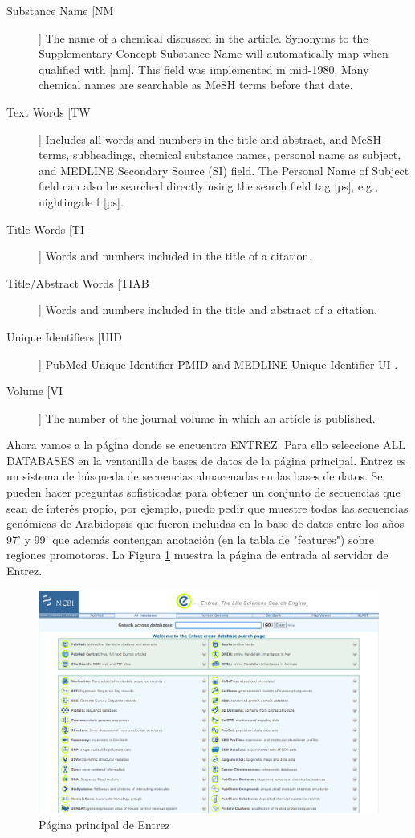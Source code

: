 \documentclass[letter,11pt]{book}
\begin{document}
\begin{description}
\item[Substance Name [NM]] The name of a chemical discussed in the article. Synonyms to the Supplementary Concept Substance Name will automatically map when qualified with [nm]. This field was implemented in mid-1980. Many chemical names are searchable as MeSH terms before that date. 
\item[Text Words [TW]] Includes all words and numbers in the title and abstract, and MeSH terms, subheadings, chemical substance names, personal name as subject, and MEDLINE Secondary Source (SI) field. The Personal Name of Subject field can also be searched directly using the search field tag [ps], e.g., nightingale f [ps]. 
\item[Title Words [TI]] Words and numbers included in the title of a citation. 
\item[Title/Abstract Words [TIAB]] Words and numbers included in the title and abstract of a citation. 
\item[Unique Identifiers [UID]] PubMed Unique Identifier PMID and MEDLINE Unique Identifier UI .
\item[Volume [VI]] The number of the journal volume in which an article is published. 
\end{description}

Ahora vamos a la página donde se encuentra ENTREZ. Para ello seleccione ALL DATABASES en la ventanilla de bases de datos de la página principal. Entrez es un sistema de búsqueda de secuencias almacenadas en las bases de datos. 
Se pueden hacer preguntas sofisticadas para obtener un conjunto de secuencias que sean de interés propio, por ejemplo, puedo pedir que muestre todas las secuencias genómicas de Arabidopsis que fueron incluidas en la base de datos entre los años 97' y 99' que además contengan anotación (en la tabla de "features") sobre regiones promotoras. La Figura \ref{screenshotentrez} muestra la página de entrada al servidor de Entrez.

\begin{figure}[ht]
\centering
   \includegraphics[width=15cm]{Figs/screenshotEntrez.png}
  \caption{\label{screenshotentrez}Página principal de Entrez}
\end{figure}
\end{document}
